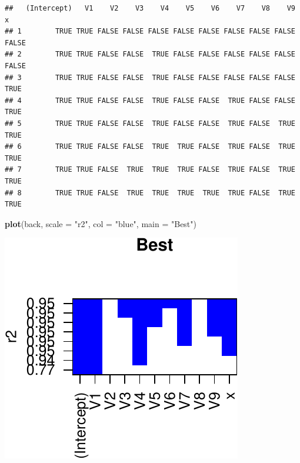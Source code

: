 \documentclass[]{article}
\newenvironment{Shaded}{\begin{snugshade}}{\end{snugshade}}
\newcommand{\DataTypeTok}[1]{\textcolor[rgb]{0.13,0.29,0.53}{#1}}
\newcommand{\KeywordTok}[1]{\textcolor[rgb]{0.13,0.29,0.53}{\textbf{#1}}}
\newcommand{\NormalTok}[1]{#1}
\newcommand{\OperatorTok}[1]{\textcolor[rgb]{0.81,0.36,0.00}{\textbf{#1}}}
\newcommand{\StringTok}[1]{\textcolor[rgb]{0.31,0.60,0.02}{#1}}
\begin{document}
\begin{Shaded}
\end{Shaded}

\begin{verbatim}
##   (Intercept)   V1    V2    V3    V4    V5    V6    V7    V8    V9     x
## 1        TRUE TRUE FALSE FALSE FALSE FALSE FALSE FALSE FALSE FALSE FALSE
## 2        TRUE TRUE FALSE FALSE  TRUE FALSE FALSE FALSE FALSE FALSE FALSE
## 3        TRUE TRUE FALSE FALSE  TRUE FALSE FALSE FALSE FALSE FALSE  TRUE
## 4        TRUE TRUE FALSE FALSE  TRUE FALSE FALSE  TRUE FALSE FALSE  TRUE
## 5        TRUE TRUE FALSE FALSE  TRUE FALSE FALSE  TRUE FALSE  TRUE  TRUE
## 6        TRUE TRUE FALSE FALSE  TRUE  TRUE FALSE  TRUE FALSE  TRUE  TRUE
## 7        TRUE TRUE FALSE  TRUE  TRUE  TRUE FALSE  TRUE FALSE  TRUE  TRUE
## 8        TRUE TRUE FALSE  TRUE  TRUE  TRUE  TRUE  TRUE FALSE  TRUE  TRUE
\end{verbatim}

\begin{Shaded}
\begin{Highlighting}[]
\KeywordTok{plot}\NormalTok{(back, }\DataTypeTok{scale =} \StringTok{"r2"}\NormalTok{, }\DataTypeTok{col =} \StringTok{"blue"}\NormalTok{, }\DataTypeTok{main =} \StringTok{"Best"}\NormalTok{)}
\end{Highlighting}
\end{Shaded}

\begin{center}\includegraphics{sol_A3_files/figure-latex/unnamed-chunk-25-1} \end{center}
\end{document}

